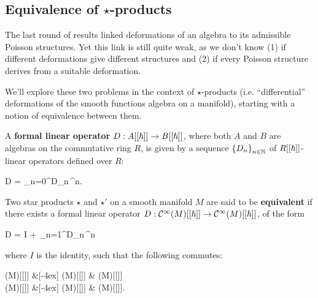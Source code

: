 \documentclass[main.tex]{subfiles}
\begin{document}
\subsection[Equivalence of star products]{Equivalence of $\star$-products}
The last round of results linked deformations of an algebra to its admissible Poisson structures. Yet this link is still quite weak, as we don't know (1) if different deformations give different structures and (2) if every Poisson structure derives from a suitable deformation.

We'll explore these two problems in the context of $\star$-products (i.e. ``differential'' deformations of the smooth functions algebra on a manifold), starting with a notion of equivalence between them.

\begin{definition}
	A \textbf{formal linear operator} $D : A[[{\boldsymbol\hslash}]] \to B[[{\boldsymbol\hslash}]]$, where both $A$ and $B$ are algebras on the commutative ring $R$, is given by a sequence $\left\{D_{n}\right\}_{n \in \mathbb{N}}$ of $R[[{\boldsymbol\hslash}]]$-linear operators defined over $R$:
	\begin{eqalign}
		D = \sum_{n=0}^\infty D_n\,\planck^n.
	\end{eqalign}
\end{definition}

\begin{definition}
	Two star products $\star$ and $\star'$ on a smooth manifold $M$ are said to be \textbf{equivalent} if there exists a formal linear operator $D: \mathcal{C}^\infty(M)[[{\boldsymbol\hslash}]] \to \mathcal{C}^\infty(M)[[{\boldsymbol\hslash}]]$, of the form
	\begin{eqalign}
		D = I + \sum_{n=1}^\infty D_n\,\planck^n
	\end{eqalign}
	where $I$ is the identity, such that the following commutes:
	\begin{diagram}
		\Cinfty(M)[[\planck]]   \&[-4ex] \Cinfty(M)[[\planck]]   \& \Cinfty(M)[[\planck]] \\
		\Cinfty(M)[[\planck]]  \&[-4ex] \Cinfty(M)[[\planck]]  \& \Cinfty(M)[[\planck]].
	\end{diagram}
\end{definition}
\end{document}
